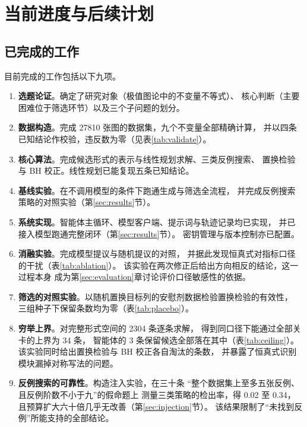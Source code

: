 
\section{当前进度与后续计划}
\label{sec:progress}

\subsection{已完成的工作}

目前完成的工作包括以下九项。

\begin{enumerate}
  \item \textbf{选题论证}。确定了研究对象（极值图论中的不变量不等式）、
  核心判断（主要困难位于筛选环节）以及三个子问题的划分。
  \item \textbf{数据构造}。完成 27810 张图的数据集，九个不变量全部精确计算，
  并以四条已知结论作校验，违反数为零（见表\ref{tab:validate}）。
  \item \textbf{核心算法}。完成候选形式的表示与线性规划求解、三类反例搜索、
  置换检验与 BH 校正。线性规划已能复现五条已知结论。
  \item \textbf{基线实验}。在不调用模型的条件下跑通生成与筛选全流程，
  并完成反例搜索策略的对照实验（第\ref{sec:results}节）。
  \item \textbf{系统实现}。智能体主循环、模型客户端、提示词与轨迹记录均已实现，
  并已接入模型跑通完整闭环（第\ref{sec:results}节）。
  密钥管理与版本控制亦已配置。
  \item \textbf{消融实验}。完成模型提议与随机提议的对照，
  并据此发现恒真式对指标口径的干扰（表\ref{tab:ablation}）。
  该实验在两次修正后给出方向相反的结论，这一过程本身
  成为第\ref{sec:evaluation}章讨论评价口径敏感性的依据。
  \item \textbf{筛选的对照实验}。以随机置换目标列的安慰剂数据检验置换检验的有效性，
  三组种子下保留条数均为零（表\ref{tab:placebo}）。
  \item \textbf{穷举上界}。对完整形式空间的 2304 条逐条求解，
  得到同口径下能通过全部关卡的上界为 34 条，
  智能体的 3 条保留候选全部落在其中（表\ref{tab:ceiling}）。
  该实验同时给出置换检验与 BH 校正各自淘汰的条数，
  并暴露了恒真式识别模块漏掉对称写法的问题。
  \item \textbf{反例搜索的可靠性}。构造注入实验，在三十条
  “整个数据集上至多五张反例、且反例阶数不小于九”的假命题上
  测量三类策略的检出率，得 0.02 至 0.34，
  且预算扩大六十倍几乎无改善（第\ref{sec:injection}节）。
  该结果限制了“未找到反例”所能支持的全部结论。
\end{enumerate}

